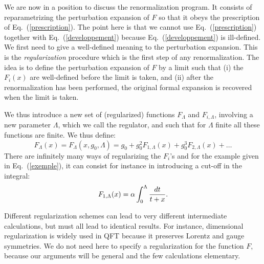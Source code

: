 \documentclass[floatfix,preprintnumbers,amsmath,amssymb,prb,12pt]{revtex4-1}
\begin{document}
We are now in a position to discuss the renormalization program. It
consists of reparametrizing the perturbation expansion of
$F$ so that it obeys the prescription of
Eq.~(\ref{prescription}). The point here is that we cannot use
Eq.~(\ref{prescription}) together with Eq.~(\ref{developpement})
because Eq.~(\ref{developpement}) is ill-defined. We first need to
give a well-defined meaning to the perturbation expansion. This is
the {\em regularization} procedure which is the first step of any
renormalization.\cite{delbourgo76,nyeo00} The idea is to define the
perturbation expansion of $F$ by a limit such that (i) the
$F_i(x)$ are well-defined before the limit is taken, and (ii)
after the renormalization has been performed, the original formal
expansion is recovered when the limit is taken. 

We thus introduce a new set of (regularized) functions $F_\Lambda$
and 
$F_{i,\Lambda}$, involving a new parameter
$\Lambda$, which we call the regulator, and such that for $\Lambda$
finite all these functions are finite. We thus define:
\begin{equation}
F_\Lambda(x)=F_\Lambda(x,g_0,\Lambda)= g_0 +g_0^2 
F_{1,\Lambda}(x) + g_0^3 F_{2,\Lambda}(x) + \dots
\label{perturbationreg}
\end{equation}
There are infinitely many ways of regularizing the $F_i$'s and for
the example given in Eq.~(\ref{exemple}), it can consist for
instance in introducing a cut-off in the integral:
\begin{equation}
F_{1,\Lambda}(x)= \alpha \int_0^\Lambda {dt\over t+x}.
\label{exempleregularise}
\end{equation}

Different regularization schemes can lead to very different
intermediate calculations, but must all lead to identical
results.\cite{foot5} For instance, dimensional regularization is
widely used in QFT because it preserves Lorentz and gauge
symmetries.\cite{hans83,gosdzinsky91,mitra98,kraus92} We do not
need here to specify a regularization for the function $F$, because
our arguments will be general and the few calculations elementary.
\end{document}
